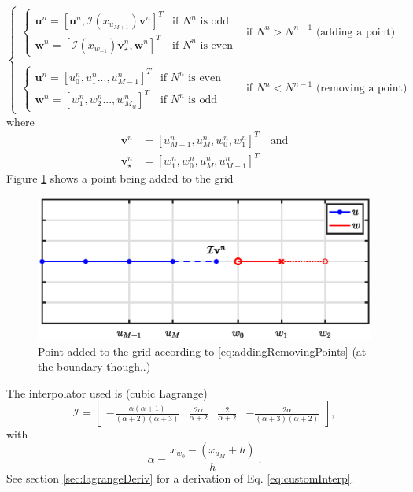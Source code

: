 \documentclass[dvipsnames]{article}
\begin{document}
\begin{equation}\label{eq:addingRemovingPoints}
    \begin{cases}
        \begin{cases}\mathbf{u}^n = [\mathbf{u}^n, \mathcal{I}(x_{u_{M+1}})\mathbf{v}^n]^T & \text{if $N^n$ is odd}\\
        \mathbf{w}^n = [\mathcal{I}(x_{w_{-1}})\mathbf{v}_\star^n, \mathbf{w}^n]^T & \text{if $N^n$ is even}
        \end{cases} & \text{if } N^n > N^{n-1} \text{ (adding a point)}\\
        \\
        \begin{cases}
        \mathbf{u}^n = [u_0^n, u_1^n ..., u_{M-1}^n]^T & \text{if $N^n$ is even} \\
         \mathbf{w}^n = [w_1^n, w_2^n ..., w_{M_w}^n]^T & \text{if $N^n$ is odd} 
        \end{cases} &\text{if } N^n < N^{n-1} \text{ (removing a point)}
    \end{cases}
\end{equation}
where
\begin{align}
    \mathbf{v}^n &= [u_{M-1}^n, u_M^n, w_0^n, w_1^n]^T \quad \text{and}\\
    \mathbf{v}_\star^n &= [w_1^n, w_0^n, u_M^n, u_{M-1}^n]^T
\end{align}
Figure \ref{fig:addingPoint} shows a point being added to the grid
\begin{figure}[h]
\centerline{\includegraphics[width=0.6\columnwidth]{addingPoint.eps} }
\caption{\label{fig:addingPoint}{Point added to the grid according to \eqref{eq:addingRemovingPoints} (at the boundary though..)}}   
\end{figure}

The interpolator used is (cubic Lagrange)
\begin{equation}\label{eq:customInterp}
    \mathcal{I} = \begin{bmatrix} -\frac{\alpha(\alpha+1)}{(\alpha+2)(\alpha+3)} &\frac{2\alpha}{\alpha+2} &\frac{2}{\alpha+2} 
    &-\frac{2\alpha}{(\alpha+3)(\alpha+2)}
    \end{bmatrix},
\end{equation}
with
\begin{equation}
    \alpha = \frac{x_{w_0} - (x_{u_M} + h)}{h}\ .
\end{equation}
See section \ref{sec:lagrangeDeriv} for a derivation of Eq. \eqref{eq:customInterp}.
\end{document}
